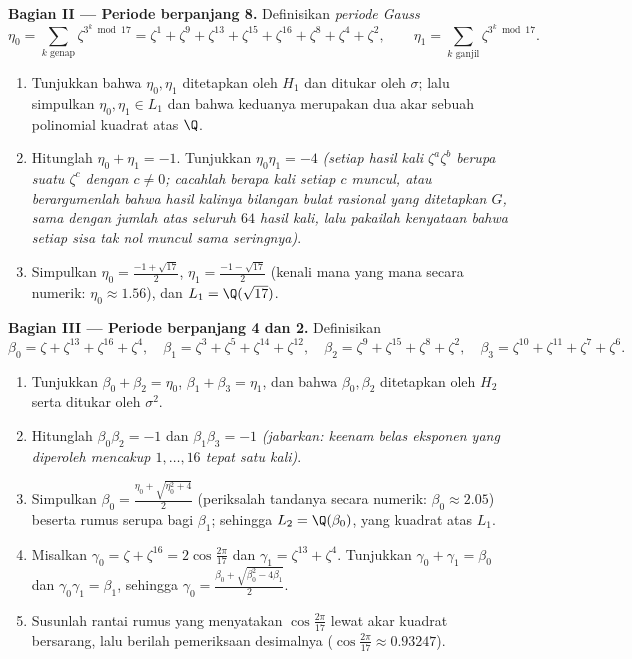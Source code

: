\begin{problem}
\medskip
\noindent\textbf{Bagian II --- Periode berpanjang 8.}
Definisikan \emph{periode Gauss}
\[
\eta_0 = \sum_{k \text{ genap}} \zeta^{3^k \bmod 17}
= \zeta^{1} + \zeta^{9} + \zeta^{13} + \zeta^{15} + \zeta^{16} +
\zeta^{8} + \zeta^{4} + \zeta^{2},
\qquad
\eta_1 = \sum_{k \text{ ganjil}} \zeta^{3^k \bmod 17}.
\]
\begin{enumerate}[resume]
  \item Tunjukkan bahwa $\eta_0, \eta_1$ ditetapkan oleh $H_1$ dan ditukar
        oleh $\sigma$; lalu simpulkan $\eta_0, \eta_1 \in L_1$ dan bahwa
        keduanya merupakan dua akar sebuah polinomial kuadrat atas $\Q$.
  \item Hitunglah $\eta_0 + \eta_1 = -1$. Tunjukkan $\eta_0\eta_1 = -4$
        \emph{(setiap hasil kali $\zeta^a\zeta^b$ berupa suatu $\zeta^c$
        dengan $c \neq 0$; cacahlah berapa kali setiap $c$ muncul, atau
        berargumenlah bahwa hasil kalinya bilangan bulat rasional yang ditetapkan
        $G$, sama dengan jumlah atas seluruh $64$ hasil kali, lalu pakailah
        kenyataan bahwa setiap sisa tak nol muncul sama seringnya)}.
  \item Simpulkan $\eta_0 = \frac{-1 + \sqrt{17}}2$, $\eta_1 =
        \frac{-1-\sqrt{17}}2$ (kenali mana yang mana
        secara numerik: $\eta_0 \approx 1.56$), dan $L_1 =
        \Q(\sqrt{17})$.
\end{enumerate}

\medskip
\noindent\textbf{Bagian III --- Periode berpanjang 4 dan 2.}
Definisikan
\[
\beta_0 = \zeta + \zeta^{13} + \zeta^{16} + \zeta^{4},\quad
\beta_1 = \zeta^3 + \zeta^5 + \zeta^{14} + \zeta^{12},\quad
\beta_2 = \zeta^9 + \zeta^{15} + \zeta^{8} + \zeta^{2},\quad
\beta_3 = \zeta^{10} + \zeta^{11} + \zeta^{7} + \zeta^{6}.
\]
\begin{enumerate}[resume]
  \item Tunjukkan $\beta_0 + \beta_2 = \eta_0$, $\beta_1 + \beta_3 =
        \eta_1$, dan bahwa $\beta_0, \beta_2$ ditetapkan oleh $H_2$
        serta ditukar oleh $\sigma^2$.
  \item Hitunglah $\beta_0\beta_2 = -1$ dan $\beta_1\beta_3 = -1$
        \emph{(jabarkan: keenam belas eksponen yang diperoleh mencakup
        $1, \dots, 16$ tepat satu kali)}.
  \item Simpulkan $\beta_0 = \frac{\eta_0 + \sqrt{\eta_0^2 + 4}}2$
        (periksalah tandanya secara numerik: $\beta_0 \approx 2.05$) beserta
        rumus serupa bagi $\beta_1$; sehingga $L_2 =
        \Q(\beta_0)$, yang kuadrat atas $L_1$.
  \item Misalkan $\gamma_0 = \zeta + \zeta^{16} =
        2\cos\frac{2\pi}{17}$ dan $\gamma_1 = \zeta^{13} +
        \zeta^4$. Tunjukkan $\gamma_0 + \gamma_1 = \beta_0$ dan
        $\gamma_0\gamma_1 = \beta_1$, sehingga $\gamma_0 =
        \frac{\beta_0 + \sqrt{\beta_0^2 - 4\beta_1}}2$.
  \item Susunlah rantai rumus yang menyatakan
        $\cos\frac{2\pi}{17}$ lewat akar kuadrat bersarang, lalu berilah
        pemeriksaan desimalnya ($\cos\frac{2\pi}{17} \approx 0.93247$).
\end{enumerate}


\end{problem}
